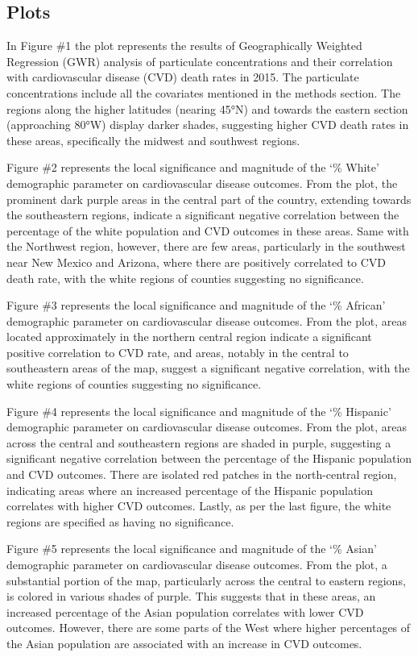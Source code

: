 \documentclass[
]{article}
\begin{document}
\subsection{Plots}\label{plots}

In Figure \#1 the plot represents the results of Geographically Weighted
Regression (GWR) analysis of particulate concentrations and their
correlation with cardiovascular disease (CVD) death rates in 2015. The
particulate concentrations include all the covariates mentioned in the
methods section. The regions along the higher latitudes (nearing 45°N)
and towards the eastern section (approaching 80°W) display darker
shades, suggesting higher CVD death rates in these areas, specifically
the midwest and southwest regions.

Figure \#2 represents the local significance and magnitude of the `\%
White' demographic parameter on cardiovascular disease outcomes. From
the plot, the prominent dark purple areas in the central part of the
country, extending towards the southeastern regions, indicate a
significant negative correlation between the percentage of the white
population and CVD outcomes in these areas. Same with the Northwest
region, however, there are few areas, particularly in the southwest near
New Mexico and Arizona, where there are positively correlated to CVD
death rate, with the white regions of counties suggesting no
significance.

Figure \#3 represents the local significance and magnitude of the `\%
African' demographic parameter on cardiovascular disease outcomes. From
the plot, areas located approximately in the northern central region
indicate a significant positive correlation to CVD rate, and areas,
notably in the central to southeastern areas of the map, suggest a
significant negative correlation, with the white regions of counties
suggesting no significance.

Figure \#4 represents the local significance and magnitude of the `\%
Hispanic' demographic parameter on cardiovascular disease outcomes. From
the plot, areas across the central and southeastern regions are shaded
in purple, suggesting a significant negative correlation between the
percentage of the Hispanic population and CVD outcomes. There are
isolated red patches in the north-central region, indicating areas where
an increased percentage of the Hispanic population correlates with
higher CVD outcomes. Lastly, as per the last figure, the white regions
are specified as having no significance.

Figure \#5 represents the local significance and magnitude of the `\%
Asian' demographic parameter on cardiovascular disease outcomes. From
the plot, a substantial portion of the map, particularly across the
central to eastern regions, is colored in various shades of purple. This
suggests that in these areas, an increased percentage of the Asian
population correlates with lower CVD outcomes. However, there are some
parts of the West where higher percentages of the Asian population are
associated with an increase in CVD outcomes.
\end{document}
